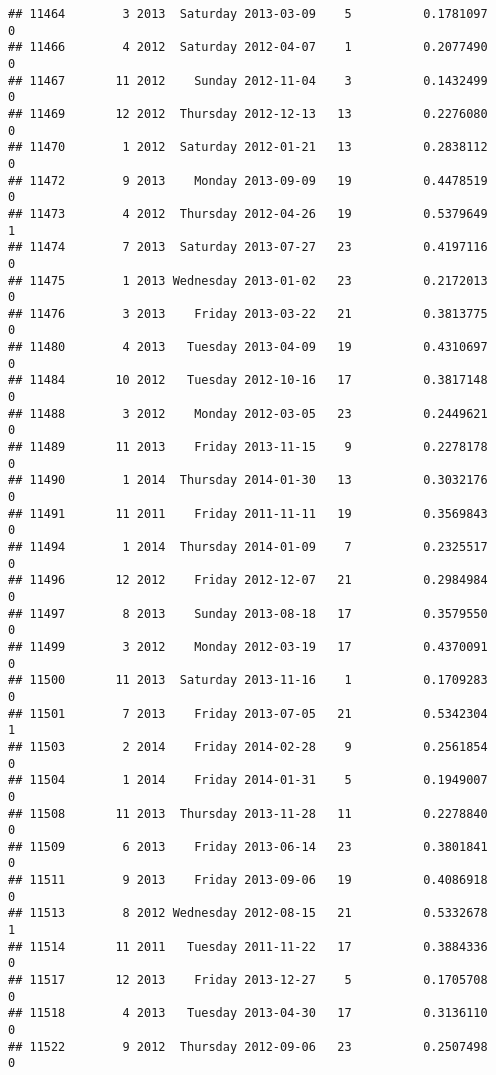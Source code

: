 \documentclass[
]{article}
\begin{document}
\begin{verbatim}
## 11464        3 2013  Saturday 2013-03-09    5          0.1781097             0
## 11466        4 2012  Saturday 2012-04-07    1          0.2077490             0
## 11467       11 2012    Sunday 2012-11-04    3          0.1432499             0
## 11469       12 2012  Thursday 2012-12-13   13          0.2276080             0
## 11470        1 2012  Saturday 2012-01-21   13          0.2838112             0
## 11472        9 2013    Monday 2013-09-09   19          0.4478519             0
## 11473        4 2012  Thursday 2012-04-26   19          0.5379649             1
## 11474        7 2013  Saturday 2013-07-27   23          0.4197116             0
## 11475        1 2013 Wednesday 2013-01-02   23          0.2172013             0
## 11476        3 2013    Friday 2013-03-22   21          0.3813775             0
## 11480        4 2013   Tuesday 2013-04-09   19          0.4310697             0
## 11484       10 2012   Tuesday 2012-10-16   17          0.3817148             0
## 11488        3 2012    Monday 2012-03-05   23          0.2449621             0
## 11489       11 2013    Friday 2013-11-15    9          0.2278178             0
## 11490        1 2014  Thursday 2014-01-30   13          0.3032176             0
## 11491       11 2011    Friday 2011-11-11   19          0.3569843             0
## 11494        1 2014  Thursday 2014-01-09    7          0.2325517             0
## 11496       12 2012    Friday 2012-12-07   21          0.2984984             0
## 11497        8 2013    Sunday 2013-08-18   17          0.3579550             0
## 11499        3 2012    Monday 2012-03-19   17          0.4370091             0
## 11500       11 2013  Saturday 2013-11-16    1          0.1709283             0
## 11501        7 2013    Friday 2013-07-05   21          0.5342304             1
## 11503        2 2014    Friday 2014-02-28    9          0.2561854             0
## 11504        1 2014    Friday 2014-01-31    5          0.1949007             0
## 11508       11 2013  Thursday 2013-11-28   11          0.2278840             0
## 11509        6 2013    Friday 2013-06-14   23          0.3801841             0
## 11511        9 2013    Friday 2013-09-06   19          0.4086918             0
## 11513        8 2012 Wednesday 2012-08-15   21          0.5332678             1
## 11514       11 2011   Tuesday 2011-11-22   17          0.3884336             0
## 11517       12 2013    Friday 2013-12-27    5          0.1705708             0
## 11518        4 2013   Tuesday 2013-04-30   17          0.3136110             0
## 11522        9 2012  Thursday 2012-09-06   23          0.2507498             0

\end{verbatim}
\end{document}
